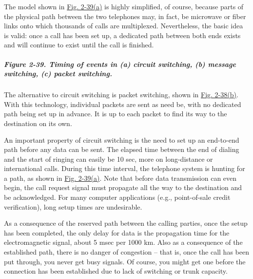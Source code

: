 \documentclass[b5paper,11pt]{memoir}
\begin{document}
The model shown in
\protect\hyperlink{0130661023_ch02lev1sec5.htmlux5cux23ch02fig39}{Fig.
2-39(a)} is highly simplified, of course, because parts of the physical
path between the two telephones may, in fact, be microwave or fiber
links onto which thousands of calls are multiplexed. Nevertheless, the
basic idea is valid: once a call has been set up, a dedicated path
between both ends exists and will continue to exist until the call is
finished.

\subparagraph[Figure 2-39. Timing of events in (a) circuit switching,
(b) message switching, (c) packet
switching.]{\texorpdfstring{\protect\hypertarget{0130661023_ch02lev1sec5.htmlux5cux23ch02fig39}{}{}Figure
2-39. Timing of events in (a) circuit switching, (b) message switching,
(c) packet
switching.}{Figure 2-39. Timing of events in (a) circuit switching, (b) message switching, (c) packet switching.}}


The alternative to circuit switching is packet switching, shown in
\protect\hyperlink{0130661023_ch02lev1sec5.htmlux5cux23ch02fig38}{Fig.
2-38(b)}. With this technology, individual packets are sent as need be,
with no dedicated path being set up in advance. It is up to each packet
to find its way to the destination on its own.

An important property of circuit switching is the need to set up an
end-to-end path {before} any data can be sent. The elapsed time between
the end of dialing and the start of ringing can easily be 10 sec, more
on long-distance or international calls. During this time interval, the
telephone system is hunting for a path, as shown in
\protect\hyperlink{0130661023_ch02lev1sec5.htmlux5cux23ch02fig39}{Fig.
2-39(a)}. Note that before data transmission can even begin, the call
request signal must propagate all the way to the destination and be
acknowledged. For many computer applications (e.g., point-of-sale credit
verification), long setup times are undesirable.

As a consequence of the reserved path between the calling parties, once
the setup has been completed, the only delay for data is the propagation
time for the electromagnetic signal, about 5 msec per 1000 km. Also as a
consequence of the established path, there is no danger of
congestion -- that is, once the call has been put through, you never get
busy signals. Of course, you might get one before the connection has
been established due to lack of switching or trunk capacity.
\end{document}

